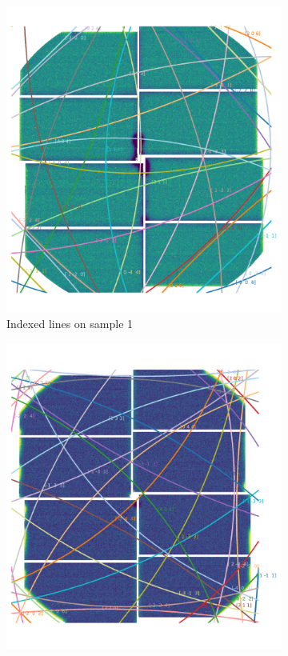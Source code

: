 \begin{figure}
	\centering
	\begin{subfigure}{0.35\textwidth}
		\includegraphics[width=\linewidth]{images/kossel_gaas1r.pdf}
		\caption{Indexed lines on sample 1}
	\end{subfigure}
\hspace{0.2cm}
	\begin{subfigure}{0.35\textwidth}
		\includegraphics[width=\linewidth]{images/kossel_gaas2r.pdf}

\end{subfigure}
\end{figure}
